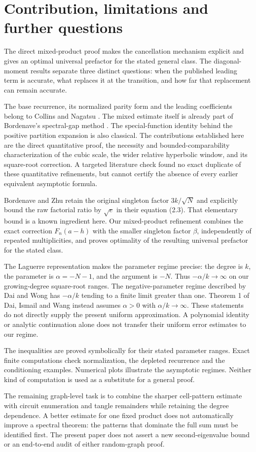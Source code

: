 \section{Contribution, limitations and further questions}

The direct mixed-product proof makes the cancellation mechanism explicit and gives an optimal universal prefactor for the stated general class. The diagonal-moment results separate three distinct questions: when the published leading term is accurate, what replaces it at the transition, and how far that replacement can remain accurate.

The base recurrence, its normalized parity form and the leading coefficients belong to Collins and Nagatsu \cite{CN}. The mixed estimate itself is already part of Bordenave's spectral-gap method \cite{Bordenave}. The special-function identity behind the positive partition expansion is also classical. The contributions established here are the direct quantitative proof, the necessity and bounded-comparability characterization of the cubic scale, the wider relative hyperbolic window, and its square-root correction. A targeted literature check found no exact duplicate of these quantitative refinements, but cannot certify the absence of every earlier equivalent asymptotic formula.

Bordenave and Zhu \cite[Lemma 2.1]{BZ} retain the original singleton factor $3k/\sqrt N$ and explicitly bound the raw factorial ratio by $\sqrt e$ in their equation (2.3). That elementary bound is a known ingredient here. Our mixed-product refinement combines the exact correction $F_n(a-h)$ with the smaller singleton factor $\beta$, independently of repeated multiplicities, and proves optimality of the resulting universal prefactor for the stated class.

The Laguerre representation makes the parameter regime precise: the degree is $k$, the parameter is $\alpha=-N-1$, and the argument is $-N$. Thus $-\alpha/k\to\infty$ on our growing-degree square-root ranges. The negative-parameter regime described by Dai and Wong \cite{DW} has $-\alpha/k$ tending to a finite limit greater than one. Theorem 1 of Dai, Ismail and Wang \cite{DIW} instead assumes $\alpha>0$ with $\alpha/k\to\infty$. These statements do not directly supply the present uniform approximation. A polynomial identity or analytic continuation alone does not transfer their uniform error estimates to our regime.

The inequalities are proved symbolically for their stated parameter ranges. Exact finite computations check normalization, the depleted recurrence and the conditioning examples. Numerical plots illustrate the asymptotic regimes. Neither kind of computation is used as a substitute for a general proof.

The remaining graph-level task is to combine the sharper cell-pattern estimate with circuit enumeration and tangle remainders while retaining the degree dependence. A better estimate for one fixed product does not automatically improve a spectral theorem: the patterns that dominate the full sum must be identified first. The present paper does not assert a new second-eigenvalue bound or an end-to-end audit of either random-graph proof.
